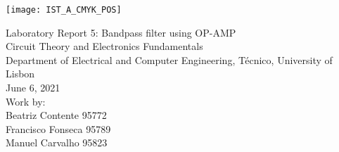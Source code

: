 
\thispagestyle {empty}

\texttt{[image: IST\_A\_CMYK\_POS]}

\begin{center}
%
\vspace{1.0cm}

\vspace{1cm}
{\FontLb Laboratory Report 5: Bandpass filter using OP-AMP} \\ %
\vspace{1cm}
{\FontSn Circuit Theory and Electronics Fundamentals} \\
\vspace{1cm}
{\FontSn Department of Electrical and Computer Engineering, Técnico, University of Lisbon} \\ %
\vspace{1cm}
{\FontSn June 6, 2021} \\ %
\vspace{1cm}
{\FontSn Work by:} \\ 
\vspace{0.5cm}
{\FontSn Beatriz Contente 95772} \\ 
\vspace{0.5cm}
{\FontSn Francisco Fonseca 95789} \\ 
\vspace{0.5cm}
{\FontSn Manuel Carvalho 95823} \\ 
%
\end{center}
